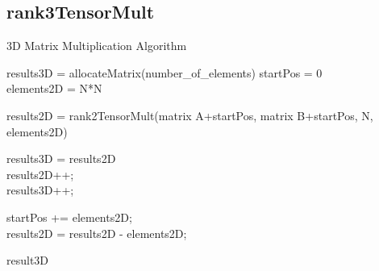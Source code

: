 \documentclass[10pt,onecolumn]{article}
\begin{document}
    \subsection{rank3TensorMult}
    \begin{algorithm}[H]
        \caption{3D Matrix Multiplication Algorithm}
        results3D = allocateMatrix(number\_of\_elements)
        startPos = 0\\
        elements2D = N*N\\
        { 
            results2D = rank2TensorMult(matrix A+startPos, matrix B+startPos, N, elements2D)
        
            {
                results3D = results2D\\
                results2D++;\\
                results3D++;
                
            }
            startPos += elements2D;\\
            results2D = results2D - elements2D;
        }%
        \Return result3D 
    \end{algorithm}
\end{document}

